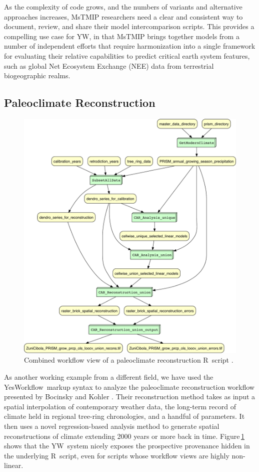 \documentclass{article}
\newcommand{\YW}{\textsf{YesWorkflow}}
\newcommand{\yw}{\textsf{YW}}
\newcommand{\R}{\textsf{R}}
\newcommand{\figref}[1]{Figure\,\ref{#1}}
\begin{document}
As the complexity of code grows, and the numbers of variants and
alternative approaches increases, MsTMIP researchers need a clear and
consistent way to document, review, and share their model
intercomparison scripts. This provides a compelling use case for \yw,
in that MsTMIP brings together models from a number of independent
efforts that require harmonization into a single framework for
evaluating their relative capabilities to predict critical earth
system features, such as global Net Ecosystem Exchange (NEE) data from
terrestrial biogeographic realms.




 \subsection{Paleoclimate Reconstruction}

 \begin{figure}[t]
   \centering
   \includegraphics[width=.7\textwidth]{SKOPE_combined-crop.pdf}
   \caption{Combined workflow view of a paleoclimate reconstruction
     \R\ script \protect\cite{bocinsky2014}.}
   \label{fig-skope}
 \end{figure}

 As another working example from a different field, we have used the
 \YW\ markup syntax to analyze the paleoclimate reconstruction
 workflow presented by Bocinsky and Kohler \cite{bocinsky2014}. Their
 reconstruction method takes as input a spatial interpolation of
 contemporary weather data, the long-term record of climate held in
 regional tree-ring chronologies, and a handful of parameters. It then
 uses a novel regression-based analysis method to generate spatial
 reconstructions of climate extending 2000 years or more back in
 time. \figref{fig-skope} shows that the \yw\ system nicely exposes
 the prospective provenance hidden in the underlying \R\ script, even
 for scripts whose workflow views are highly non-linear.
\end{document}

